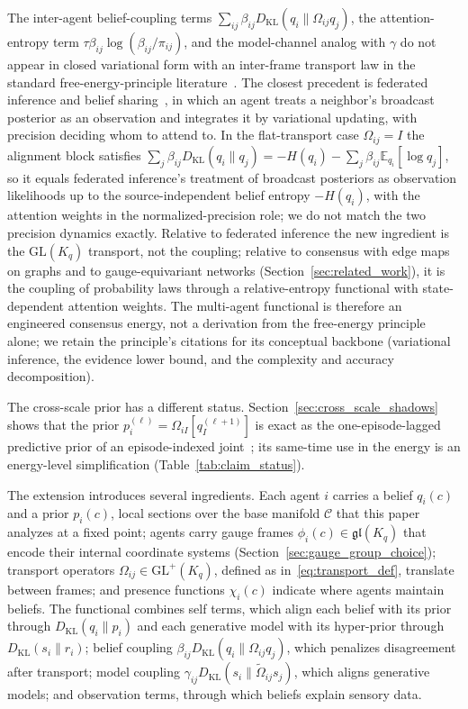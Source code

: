 \documentclass[11pt]{article}
\begin{document}
The inter-agent belief-coupling terms $\sum_{ij}\beta_{ij}D_{\mathrm{KL}}(q_i\|\Omega_{ij}q_j)$, the attention-entropy term $\tau\beta_{ij}\log(\beta_{ij}/\pi_{ij})$, and the model-channel analog with $\gamma$ do not appear in closed variational form with an inter-frame transport law in the standard free-energy-principle literature~\cite{Friston2010, parr2022active}. The closest precedent is federated inference and belief sharing~\cite{friston2024federated}, in which an agent treats a neighbor's broadcast posterior as an observation and integrates it by variational updating, with precision deciding whom to attend to. In the flat-transport case $\Omega_{ij} = I$ the alignment block satisfies $\sum_j \beta_{ij}D_{\mathrm{KL}}(q_i\|q_j) = -H(q_i) - \sum_j \beta_{ij}\mathbb{E}_{q_i}[\log q_j]$, so it equals federated inference's treatment of broadcast posteriors as observation likelihoods up to the source-independent belief entropy $-H(q_i)$, with the attention weights in the normalized-precision role; we do not match the two precision dynamics exactly. Relative to federated inference the new ingredient is the $\mathrm{GL}(K_q)$ transport, not the coupling; relative to consensus with edge maps on graphs and to gauge-equivariant networks (Section~\ref{sec:related_work}), it is the coupling of probability laws through a relative-entropy functional with state-dependent attention weights. The multi-agent functional is therefore an engineered consensus energy, not a derivation from the free-energy principle alone; we retain the principle's citations for its conceptual backbone (variational inference, the evidence lower bound, and the complexity and accuracy decomposition).

The cross-scale prior has a different status. Section~\ref{sec:cross_scale_shadows} shows that the prior $p_i^{(\ell)}=\Omega_{iI}[q_I^{(\ell+1)}]$ is exact as the one-episode-lagged predictive prior of an episode-indexed joint~\cite[Ch.~12]{DennisGaugeVFE2026}; its same-time use in the energy is an energy-level simplification (Table~\ref{tab:claim_status}).

The extension introduces several ingredients. Each agent $i$ carries a belief $q_i(c)$ and a prior $p_i(c)$, local sections over the base manifold $\mathcal{C}$ that this paper analyzes at a fixed point; agents carry gauge frames $\phi_i(c) \in \mathfrak{gl}(K_q)$ that encode their internal coordinate systems (Section~\ref{sec:gauge_group_choice}); transport operators $\Omega_{ij} \in \mathrm{GL}^+(K_q)$, defined as in~\eqref{eq:transport_def}, translate between frames; and presence functions $\chi_i(c)$ indicate where agents maintain beliefs. The functional combines self terms, which align each belief with its prior through $D_{\mathrm{KL}}(q_i \| p_i)$ and each generative model with its hyper-prior through $D_{\mathrm{KL}}(s_i \| r_i)$; belief coupling $\beta_{ij}D_{\mathrm{KL}}(q_i\|\Omega_{ij}q_j)$, which penalizes disagreement after transport; model coupling $\gamma_{ij}D_{\mathrm{KL}}(s_i\|\tilde{\Omega}_{ij}s_j)$, which aligns generative models; and observation terms, through which beliefs explain sensory data.
\end{document}
